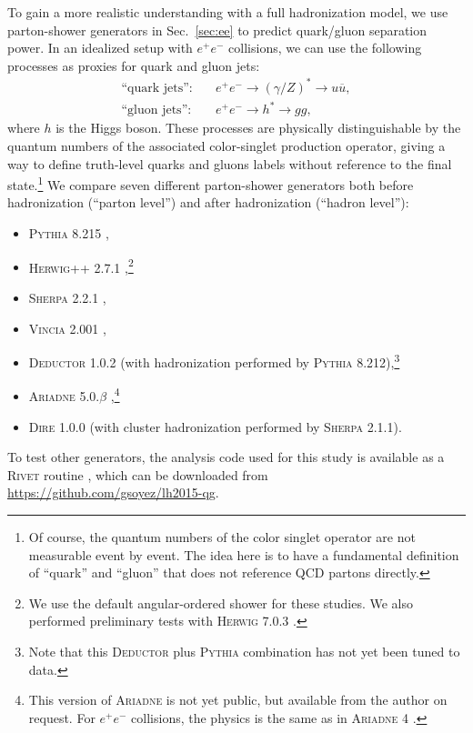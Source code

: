 \documentclass[11pt,letterpaper]{article}
\DeclareRobustCommand{\Sec}[1]{Sec.~\ref{#1}}
\begin{document}
To gain a more realistic understanding with a full hadronization model, we use parton-shower generators in \Sec{sec:ee} to predict quark/gluon separation power.  In an idealized setup with $e^+e^-$ collisions, we can use the following processes as proxies for quark and gluon jets:
\begin{align}
\text{``quark jets''}: \quad & e^+e^- \to (\gamma/Z)^* \to u \overline{u}, \\
\text{``gluon jets''}: \quad & e^+e^- \to h^* \to g g,
\end{align}
where $h$ is the Higgs boson.  These processes are physically
distinguishable by the quantum numbers of the associated color-singlet
production operator, giving a way to define truth-level quarks and
gluons labels without reference to the final state.\footnote{Of course, the quantum numbers of the color singlet operator are not measurable event by event.  The idea here is to have a fundamental definition of ``quark'' and ``gluon'' that does not reference QCD partons directly.}  We
compare seven different parton-shower generators both before
hadronization (``parton level'') and after hadronization (``hadron
level''):
\begin{itemize}
\item \textsc{Pythia 8.215} \cite{Sjostrand:2014zea},
\item \textsc{Herwig++ 2.7.1} \cite{Bahr:2008pv,Bellm:2013hwb},\footnote{We use the default angular-ordered shower for these studies.  We also performed preliminary tests with \textsc{Herwig 7.0.3} \cite{Bellm:2015jjp}.}
\item \textsc{Sherpa 2.2.1} \cite{Gleisberg:2008ta},
\item \textsc{Vincia 2.001} \cite{Fischer:2016vfv},
\item \textsc{Deductor 1.0.2} \cite{Nagy:2014mqa} (with hadronization performed by \textsc{Pythia 8.212}),\footnote{Note that this
\textsc{Deductor} plus \textsc{Pythia} combination has not yet been tuned to data.}
\item \textsc{Ariadne 5.0.$\beta$} \cite{Flensburg:2011kk},\footnote{This version of \textsc{Ariadne} is not yet public, but available from the author on request.  For $e^+ e^-$ collisions, the physics is the same as in \textsc{Ariadne 4} \cite{Lonnblad:1992tz}.}
\item \textsc{Dire 1.0.0} \cite{Hoche:2015sya} (with cluster hadronization performed by \textsc{Sherpa 2.1.1}).
\end{itemize}
To test other generators, the analysis code used for this study is available as a \textsc{Rivet} routine \cite{Buckley:2010ar}, which can be downloaded from \url{https://github.com/gsoyez/lh2015-qg}.
\end{document}
